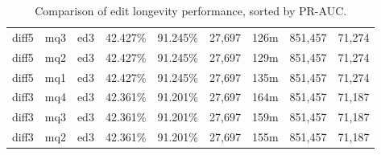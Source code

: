\begin{sidewaystable}[!ph]
\begin{center}
\begin{tabular}{|c|c|c||c|c||c|c|c|c|}
diff5 & mq3 & ed3 & 42.427\% & 91.245\% & 27,697 & 126m & 851,457 & 71,274 \\
diff5 & mq2 & ed3 & 42.427\% & 91.245\% & 27,697 & 129m & 851,457 & 71,274 \\
diff5 & mq1 & ed3 & 42.427\% & 91.245\% & 27,697 & 135m & 851,457 & 71,274 \\
diff3 & mq4 & ed3 & 42.361\% & 91.201\% & 27,697 & 164m & 851,457 & 71,187 \\
diff3 & mq3 & ed3 & 42.361\% & 91.201\% & 27,697 & 159m & 851,457 & 71,187 \\
diff3 & mq2 & ed3 & 42.361\% & 91.201\% & 27,697 & 155m & 851,457 & 71,187 \\
\hline
\end{tabular}
\end{center}
\caption{Comparison of edit longevity performance,
    sorted by PR-AUC.}
\label{tab:editshoutE}
\end{sidewaystable}
\clearpage
